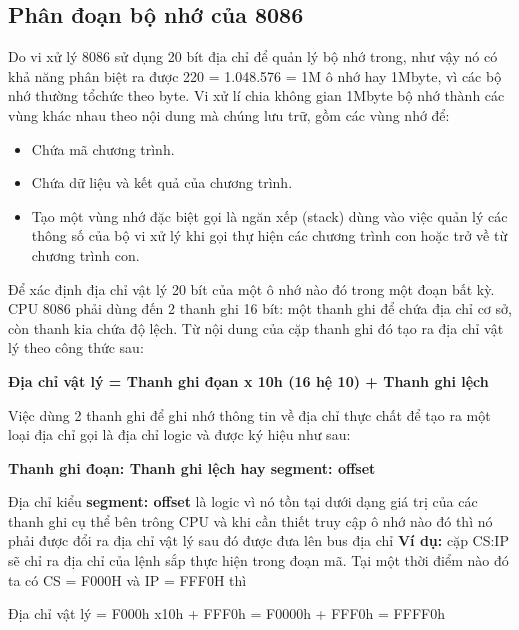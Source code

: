 \documentclass[../report.tex]{subfiles}
\begin{document}
\subsection{Phân đoạn bộ nhớ của 8086}
Do vi xử lý 8086 sử dụng 20 bít địa chỉ để quản lý bộ nhớ trong, như vậy nó có khả
năng phân biệt ra được 220 = 1.048.576 = 1M ô nhớ hay 1Mbyte, vì các bộ nhớ thường tổchức theo byte. Vi xử lí chia không gian 1Mbyte bộ nhớ thành các vùng khác nhau theo nội
dung mà chúng lưu trữ, gồm các vùng nhớ để:
\begin{itemize}
\item Chứa mã chương trình. 
\item Chứa dữ liệu và kết quả của chương trình. 
\item Tạo một vùng nhớ đặc biệt gọi là ngăn xếp (stack) dùng vào việc quản lý các thông số
của bộ vi xử lý khi gọi thự hiện các chương trình con hoặc trở về từ chương trình con. 
\end{itemize}

Để xác định địa chỉ vật lý 20 bít của một ô nhớ nào đó trong một đoạn bất kỳ. CPU 8086 phải dùng
đến 2 thanh ghi 16 bít: một thanh ghi để chứa địa chỉ cơ sở, còn thanh kia chứa độ lệch. Từ
nội dung của cặp thanh ghi đó tạo ra địa chỉ vật lý theo công thức sau: 
\begin{center}
\textbf{Địa chỉ vật lý = Thanh ghi đọan x 10h (16 hệ 10) + Thanh ghi lệch}
\end{center}

Việc dùng 2 thanh ghi để ghi nhớ thông tin về địa chỉ thực chất để tạo ra một loại địa
chỉ gọi là địa chỉ logic và được ký hiệu như sau:

\begin{center}
\textbf{Thanh ghi đoạn: Thanh ghi lệch hay segment: offset}
\end{center}

Địa chỉ kiểu \textbf{segment: offset} là logic vì nó tồn tại dưới dạng giá trị của các thanh ghi cụ
thể bên trông CPU và khi cần thiết truy cập ô nhớ nào đó thì nó phải được đổi ra địa chỉ vật lý
sau đó được đưa lên bus địa chỉ
\newline
\textbf{Ví dụ:}  cặp CS:IP sẽ chỉ ra địa chỉ của lệnh sắp thực hiện trong đoạn mã. Tại một
thời điểm nào đó ta có CS = F000H và IP = FFF0H thì
\begin{center}
Địa chỉ vật lý = F000h x10h + FFF0h = F0000h + FFF0h = FFFF0h
\end{center}
\end{document}
